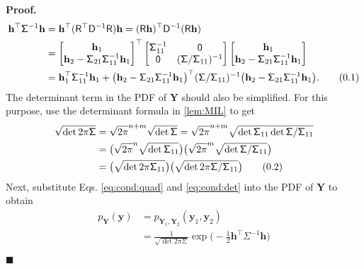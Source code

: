 \documentclass[10pt]{article}
\theoremstyle{definition}
\newenvironment{prf}{\noindent\textbf{Proof.}}{\hfill$\blacksquare$}
\newcommand\eqnum{\addtocounter{equation}{1}\tag{\arabic{section}.\arabic{equation}}}
\begin{document}
\begin{prf}
\begin{align*}
\mathbf{h}^{\top} \mathsf{\Sigma}^{-1} \mathbf{h} 
&= \mathbf{h}^{\top} (\mathsf{R}^{\top}\mathsf{D}^{-1}\mathsf{R})\mathbf{h} 
= (\mathsf{R}\mathbf{h})^{\top}\mathsf{D}^{-1}(\mathsf{R}\mathbf{h}) \\
&=
\begin{bmatrix}
\mathbf{h}_1 \\
\mathbf{h}_2-\mathsf{\Sigma}_{21}\mathsf{\Sigma}_{11}^{-1}\mathbf{h}_1
\end{bmatrix}^{\top}
\begin{bmatrix}
\mathsf{\Sigma}_{11}^{-1} & \mathsf{0} \\
\mathsf{0} & (\mathsf{\Sigma}/\mathsf{\Sigma}_{11})^{-1}
\end{bmatrix}
\begin{bmatrix}
\mathbf{h}_1 \\
\mathbf{h}_2-\mathsf{\Sigma}_{21}\mathsf{\Sigma}_{11}^{-1}\mathbf{h}_1
\end{bmatrix}
\\
&= \mathbf{h}_1^{\top}\mathsf{\Sigma}_{11}^{-1}\mathbf{h}_1 +
\big(\mathbf{h}_2-\mathsf{\Sigma}_{21}\mathsf{\Sigma}_{11}^{-1}\mathbf{h}_1\big)^{\top}
(\mathsf{\Sigma}/\mathsf{\Sigma}_{11})^{-1}
\big(\mathbf{h}_2-\mathsf{\Sigma}_{21}\mathsf{\Sigma}_{11}^{-1}\mathbf{h}_1\big).
\eqnum
\label{eq:cond:quad}
\end{align*}
The determinant term in the PDF of $\mathbf{Y}$ should also be simplified. For this purpose, use the determinant formula in \cref{lem:MIL} to get
\begin{align*}
\sqrt{\det2\pi\mathsf{\Sigma}} &= \sqrt{2\pi}^{n+m} \sqrt{\det\mathsf{\Sigma}}
= \sqrt{2\pi}^{n+m} \sqrt{\det\mathsf{\Sigma}_{11}\det\mathsf{\Sigma}/\mathsf{\Sigma}_{11}} \\
&= \big(\sqrt{2\pi}^{n}\sqrt{\det\mathsf{\Sigma}_{11}}\big)
\big(\sqrt{2\pi}^{m}\sqrt{\det\mathsf{\Sigma}/\mathsf{\Sigma}_{11}}\big) \\
&= \big(\sqrt{\det2\pi\mathsf{\Sigma}_{11}}\big)
\big(\sqrt{\det2\pi\mathsf{\Sigma}/\mathsf{\Sigma}_{11}}\big)
\eqnum
\label{eq:cond:det}
\end{align*}
Next, substitute Eqs. \eqref{eq:cond:quad} and \eqref{eq:cond:det} into the PDF of $\mathbf{Y}$ to obtain
\begin{align*}
p_{\mathbf{Y}}(\mathbf{y}) &= p_{\mathbf{Y}_1,\mathbf{Y}_2}(\mathbf{y}_1,\mathbf{y}_2) \\
&= \frac{1}{\sqrt{\det 2 \pi \mathsf{\Sigma}}} \exp\Big(-\frac{1}{2}\mathbf{h}^{\top}\mathsf{\Sigma}^{-1}\mathbf{h}\Big) \\

\end{align*}
\end{prf}
\end{document}
